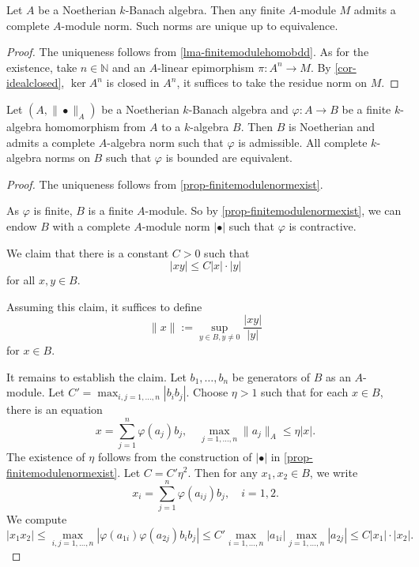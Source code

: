 \begin{proposition}\label{prop-finitemodulenormexist}
    Let $A$ be a Noetherian $k$-Banach algebra. Then any finite $A$-module $M$ admits a complete $A$-module norm. Such norms are unique up to equivalence.
\end{proposition}
\begin{proof}
    The uniqueness follows from \cref{lma-finitemodulehomobdd}. As for the existence, take $n\in \mathbb{N}$ and an $A$-linear epimorphism $\pi:A^n\rightarrow M$. By \cref{cor-idealclosed}, $\ker A^n$ is closed in $A^n$, it suffices to take the residue norm on $M$.
\end{proof}

\begin{proposition}\label{prop-algebrafinitenormadmi}
    Let $(A,\|\bullet\|_A)$ be a Noetherian $k$-Banach algebra and $\varphi:A\rightarrow B$ be a finite $k$-algebra homomorphism from $A$ to a $k$-algebra $B$. Then $B$ is Noetherian and admits a complete $A$-algebra norm such that $\varphi$ is admissible.
    All complete $k$-algebra norms on $B$ such that $\varphi$ is bounded are equivalent.
\end{proposition}
\begin{proof}
    The uniqueness follows from \cref{prop-finitemodulenormexist}.

    As $\varphi$ is finite, $B$ is a finite $A$-module. So by \cref{prop-finitemodulenormexist}, we can endow $B$ with a complete $A$-module norm $|\bullet|$ such that $\varphi$ is contractive. 

    We claim that there is a constant $C>0$ such that 
    \[
        |xy|\leq C |x|\cdot |y|  
    \]
    for all $x,y\in B$.
    
    Assuming this claim, it suffices to define
    \[
        \|x\|:=\sup_{y\in B,y\neq 0}\frac{|xy|}{|y|}
    \]
    for $x\in B$.

    It remains to establish the claim. Let $b_1,\ldots,b_n$ be generators of $B$ as an $A$-module. Let $C'=\max_{i,j=1,\ldots,n} |b_ib_j|$. Choose $\eta>1$ such that for each $x\in B$, there is an equation
    \[
        x=\sum_{j=1}^n \varphi(a_j)b_j,\quad \max_{j=1,\ldots,n} \|a_j\|_A \leq \eta |x|. 
    \]
    The existence of $\eta$ follows from the construction of $|\bullet|$ in \cref{prop-finitemodulenormexist}. Let $C=C'\eta^2$. Then for any $x_1,x_2\in B$, we write
    \[
        x_i=\sum_{j=1}^n \varphi(a_{ij})b_j,\quad i=1,2. 
    \]
    We compute
    \[
        |x_1x_2|\leq \max_{i,j=1,\ldots,n} |\varphi(a_{1i})\varphi(a_{2j})b_ib_j|\leq C'\max_{i=1,\ldots,n}|a_{1i}|\max_{j=1,\ldots,n}|a_{2j}|\leq C|x_1|\cdot|x_2|.  
    \]
\end{proof}

